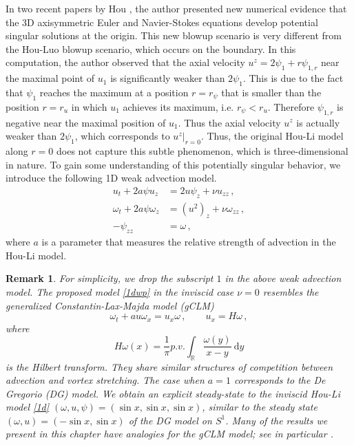 \documentclass[12pt]{caltech_thesis}
\newtheorem{remark}[theorem]{Remark}
\numberwithin{equation}{section}
\begin{document}
In two recent papers by Hou \cite{hou2022potential, hou2022potentially}, the author presented new numerical evidence that the 3D axisymmetric Euler and Navier-Stokes equations develop potential singular solutions at the origin. This new blowup scenario is very different from the Hou-Luo blowup scenario, which occurs on the boundary. In this computation, the author observed that the axial velocity $u^{z}=2 \psi_{1}+r \psi_{1, r}$ near the maximal point of $u_1$ is significantly weaker than $2\psi_1$. This is due to the fact that $\psi_1$ reaches the maximum at a position $r=r_\psi$ that is smaller than the position $r=r_u$ in which  $u_1$ achieves its maximum, i.e. $r_\psi < r_u$. Therefore $\psi_{1, r}$ is negative near the maximal position of $u_1$. Thus the axial velocity $u^z$ is actually weaker than $2 \psi_1$, which corresponds to $u^z |_{r=0}$. Thus, the original Hou-Li model along $r=0$ does not capture this subtle phenomenon, which is three-dimensional in nature. To gain some understanding of this potentially singular behavior, we introduce the following 1D weak advection model.
\begin{equation}
\label{1dwp}
\begin{aligned}
u_{ t}+2 a\psi u_{ z} &=2 u \psi_{ z}+\nu u_{zz}\,, \\
\omega_{ t}+2 a\psi\omega_{ z} &=\left(u^{2}\right)_{z}+\nu \omega_{zz}\,, \\
- \psi_{zz} &=\omega\,,
\end{aligned}
\end{equation}
where $a$ is a parameter that measures the relative strength of advection in the Hou-Li model.
\begin{remark}
For simplicity, we drop the subscript $1$ in the above weak advection model.
The proposed model \eqref{1dwp} in the inviscid case $\nu=0$  resembles the generalized Constantin-Lax-Majda model (gCLM) \cite{okamoto2008generalization} 
$$\omega_t+au\omega_x=u_x\omega\,,\qquad u_x=H\omega\,,$$
        where
     $$
H \omega(x)=\frac{1}{\pi} p.v. \int_{\mathbb{R}} \frac{\omega(y)}{x-y} \mathrm{~d} y
$$
is the Hilbert transform. They share similar structures of competition between advection and vortex stretching. The case when $a=1$ corresponds to the De Gregorio (DG) model.
We obtain an explicit steady-state to the inviscid Hou-Li model \eqref{1d} $(\omega,u,\psi)=(\sin x,\sin x, \sin x)$, similar to the steady state $(\omega,u)=(-\sin x,\sin x)$ of the DG model on $S^1$. Many of the results we present in this chapter have analogies for the gCLM model; see in particular \cite{chen2021regularity,chen2021slightly}.
\end{remark}
\end{document}
